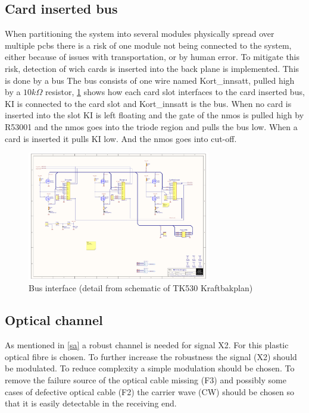\subsection{Card inserted bus}
When partitioning the system into several modules physically spread over multiple pcbs there is a risk of one module not being connected to the system, either because of issues with transportation, or by human error. To mitigate this risk, detection of wich cards is inserted into the back plane is implemented. This is done by a bus  
The bus consists of one wire named Kort\_innsatt, pulled high by a $10k\Omega$ resistor, \cref{fig:ki_bi} shows how each card slot interfaces to the card inserted bus, KI is connected to the card slot and Kort\_innsatt is the bus. When no card is inserted into the slot KI is left floating and the gate of the nmos is pulled high by R53001 and the nmos goes into the triode region and pulls the bus low. When a card is inserted it pulls KI low. And the nmos goes into cut-off.

\begin{figure}[h]
    \centering
    \includegraphics[trim={1cm 15cm 25.5cm 3cm},clip,width=8cm]{img/TK530_Kraftbakplan.pdf}
    \caption{Bus interface (detail from schematic of TK530 Kraftbakplan)}
    \label{fig:ki_bi}
\end{figure}

\subsection{Optical channel}
\label{optical}

As mentioned in \cref{sa} a robust channel is needed for signal X2. For this plastic optical fibre is chosen. To further increase the robustness the signal (X2) should be modulated. To reduce complexity a simple modulation should be chosen. To remove the failure source of the optical cable missing (F3) and possibly some cases of defective optical cable (F2) the carrier wave (CW) should be chosen so that it is easily detectable in the receiving end.

